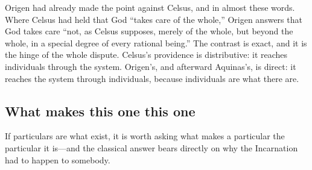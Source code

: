 Origen had already made the point against Celsus, and in almost these words. Where Celsus had held that God ``takes care of the whole,'' Origen answers that God takes care ``not, as Celsus supposes, merely of the whole, but beyond the whole, in a special degree of every rational being.'' The contrast is exact, and it is the hinge of the whole dispute. Celsus's providence is distributive: it reaches individuals through the system. Origen's, and afterward Aquinas's, is direct: it reaches the system through individuals, because individuals are what there are.

\subsection{What makes this one this one}

If particulars are what exist, it is worth asking what makes a particular the particular it is---and the classical answer bears directly on why the Incarnation had to happen to somebody.


